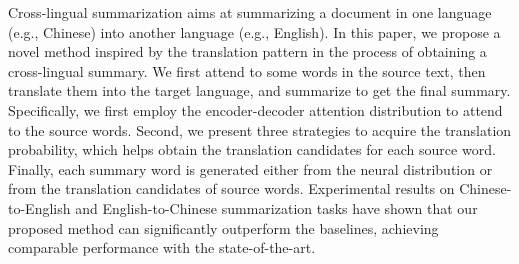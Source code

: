 Cross-lingual summarization aims at summarizing a document in one language (e.g., Chinese) into another language (e.g., English). In this paper, we propose a novel method inspired by the translation pattern in the process of obtaining a cross-lingual summary. We first attend to some words in the source text, then translate them into the target language, and summarize to get the final summary. Specifically, we first employ the encoder-decoder attention distribution to attend to the source words. Second, we present three strategies to acquire the translation probability, which helps obtain the translation candidates for each source word. Finally, each summary word is generated either from the neural distribution or from the translation candidates of source words. Experimental results on Chinese-to-English and English-to-Chinese summarization tasks have shown that our proposed method can significantly outperform the baselines, achieving comparable performance with the state-of-the-art.
